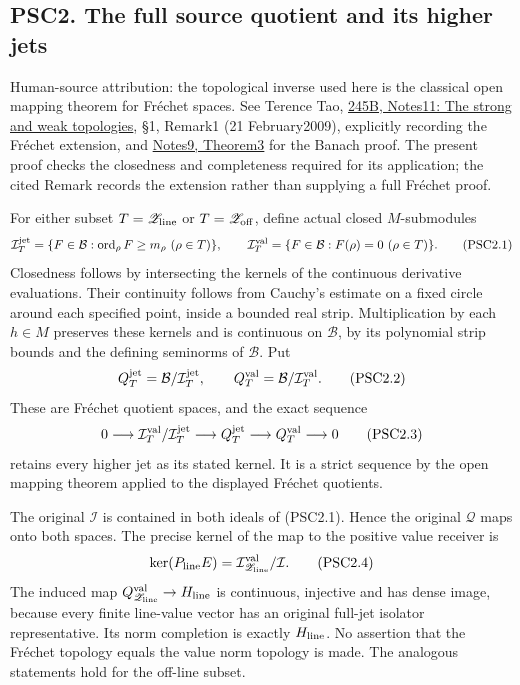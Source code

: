\subsection{PSC2. The full source quotient and its higher
jets}\label{psc2.-the-full-source-quotient-and-its-higher-jets}

Human-source attribution: the topological inverse used here is the
classical open mapping theorem for Fréchet spaces. See Terence Tao,
\href{https://terrytao.wordpress.com/2009/02/21/245b-notes-11-the-strong-and-weak-topologies/}{245B,
Notes11: The strong and weak topologies}, §1, Remark1 (21 February2009),
explicitly recording the Fréchet extension, and
\href{https://terrytao.wordpress.com/2009/02/01/245b-notes-9-the-baire-category-theorem-and-its-banach-space-consequences/}{Notes9,
Theorem3} for the Banach proof. The present proof checks the closedness
and completeness required for its application; the cited Remark records
the extension rather than supplying a full Fréchet proof.

For either subset \(T=\mathscr Z_{\rm line}\) or
\(T=\mathscr Z_{\rm off}\), define actual closed \(M\)-submodules \[
\mathcal I_T^{\rm jet}=\{F\in\mathcal B:\operatorname{ord}_\rho F\ge m_\rho\ (\rho\in T)\},
\qquad
\mathcal I_T^{\rm val}=\{F\in\mathcal B:F(\rho)=0\ (\rho\in T)\}.
\tag{PSC2.1}
\] Closedness follows by intersecting the kernels of the continuous
derivative evaluations. Their continuity follows from Cauchy's estimate
on a fixed circle around each specified point, inside a bounded real
strip. Multiplication by each \(h\in M\) preserves these kernels and is
continuous on \(\mathcal B\), by its polynomial strip bounds and the
defining seminorms of \(\mathcal B\). Put \[
Q_T^{\rm jet}=\mathcal B/\mathcal I_T^{\rm jet},\qquad
Q_T^{\rm val}=\mathcal B/\mathcal I_T^{\rm val}.
\tag{PSC2.2}
\] These are Fréchet quotient spaces, and the exact sequence \[
0\longrightarrow\mathcal I_T^{\rm val}/\mathcal I_T^{\rm jet}
\longrightarrow Q_T^{\rm jet}\longrightarrow Q_T^{\rm val}
\longrightarrow0
\tag{PSC2.3}
\] retains every higher jet as its stated kernel. It is a strict
sequence by the open mapping theorem applied to the displayed Fréchet
quotients.

The original \(\mathcal I\) is contained in both ideals of (PSC2.1).
Hence the original \(\mathcal Q\) maps onto both spaces. The precise
kernel of the map to the positive value receiver is \[
\ker(P_{\rm line}E)=\mathcal I_{\mathscr Z_{\rm line}}^{\rm val}/\mathcal I.
\tag{PSC2.4}
\] The induced map
\(Q_{\mathscr Z_{\rm line}}^{\rm val}\to H_{\rm line}\) is continuous,
injective and has dense image, because every finite line-value vector
has an original full-jet isolator representative. Its norm completion is
exactly \(H_{\rm line}\). No assertion that the Fréchet topology equals
the value norm topology is made. The analogous statements hold for the
off-line subset.

